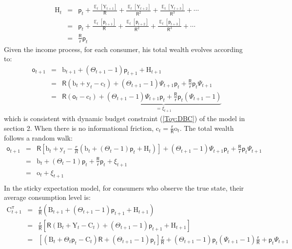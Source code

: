 \documentclass[12pt,letterpaper]{article}
\DeclareMathOperator{\E}{\mathbb{E}}
\begin{document}
\begin{eqnarray}
\mathrm{H}_{t} & = & \mathsf{p}_{t}+\frac{\E_{t}[\mathrm{Y}_{t+1}]}{\mathsf{R}}+\frac{\E_{t}[\mathrm{Y}_{t+2}]}{\mathsf{R}^2}+\frac{\E_{t}[\mathrm{Y}_{t+3}]}{\mathsf{R}^3}+\cdots\\
& = & \mathsf{p}_{t}+\frac{\E_{t}[\mathsf{p}_{t+1}]}{\mathsf{R}}+\frac{\E_{t}[\mathsf{p}_{t+2}]}{\mathsf{R}^2}+\frac{\E_{t}[\mathsf{p}_{t+3}]}{\mathsf{R}^3}+\cdots\\
& = & \frac{\mathsf{R}}{\mathsf{r}}\mathsf{p}_{t}
\end{eqnarray}
Given the income process, for each consumer, his total wealth evolves according to:
\begin{eqnarray*}
	\mathsf{o}_{t+1} & = & \mathrm{b}_{t+1}+\left(\Theta_{t+1}-1\right)\mathsf{p}_{t+1}+\mathrm{H}_{t+1}\\
	& = & \mathsf{R}\left(\mathrm{b}_{t}+\mathrm{y}_{t}-\mathrm{c}_{t}\right)+\left(\Theta_{t+1}-1\right)\Psi_{t+1}\mathsf{p}_{t}+\frac{\mathsf{R}}{\mathsf{r}}\mathsf{p}_{t}\Psi_{t+1}\\
	& = & \mathsf{R}\left(\mathsf{o}_{t}-\mathrm{c}_{t}\right)+\underbrace{\left(\Theta_{t+1}-1\right)\Psi_{t+1}\mathsf{p}_{t}+\frac{\mathsf{R}}{\mathsf{r}}\mathsf{p}_{t}\left(\Psi_{t+1}-1\right)}_{=\xi_{t+1}}
\end{eqnarray*}
which is consistent with dynamic budget constraint (\ref{Toy:DBC}) of the model in section 2. When there is no informational friction, $\mathrm{c}_{t}=\frac{\mathsf{r}}{\mathsf{R}}\mathrm{o}_{t}$. The total wealth follows a random walk:
\begin{eqnarray*}
	\mathsf{o}_{t+1}& = & \mathsf{R}\left[\mathrm{b}_{t}+\mathrm{y}_{t}-\frac{r}{R}\left(\mathrm{b}_{t}+\left(\Theta_{t}-1\right)\mathsf{p}_{t}+\mathrm{H}_{t}\right)\right]+\left(\Theta_{t+1}-1\right)\Psi_{t+1}\mathsf{p}_{t}+\frac{\mathsf{R}}{\mathsf{r}}\mathsf{p}_{t}\Psi_{t+1}\\
	& = &
	\mathrm{b}_{t}+\left(\Theta_{t}-1\right)\mathsf{p}_{t}+\frac{\mathsf{R}}{\mathsf{r}}\mathsf{p}_{t}+\xi_{t+1}\\
	& = & \mathrm{o}_{t}+\xi_{t+1}\\
\end{eqnarray*}
In the sticky expectation model, for consumers who observe the true state, their average consumption level is:
\begin{eqnarray} \label{A1: AggC}
\mathrm{C}^{\pi}_{t+1} & = & \frac{\mathsf{r}}{\mathsf{R}}\left(\mathrm{B}_{t+1}+\left(\Theta_{t+1}-1\right)\mathsf{p}_{t+1}+\mathrm{H}_{t+1}\right) \\
& = & \frac{\mathsf{r}}{\mathsf{R}}\left[\mathsf{R}\left(\mathrm{B}_{t}+\mathrm{Y}_{t}-\mathrm{C}_{t}\right)+\left(\Theta_{t+1}-1\right)\mathsf{p}_{t+1}+\mathrm{H}_{t+1}\right] \nonumber\\
& = & \left[\left(\mathrm{B}_{t}+\Theta_{t}\mathsf{p}_{t}-\mathrm{C}_{t}\right)\mathsf{R}+\left(\Theta_{t+1}-1\right)\mathsf{p}_{t}\right]\frac{\mathsf{r}}{\mathsf{R}}+\left(\Theta_{t+1}-1\right)\mathsf{p}_{t}\left(\Psi_{t+1}-1\right)\frac{\mathsf{r}}{\mathsf{R}}+\mathsf{p}_{t}\Psi_{t+1} \nonumber
\end{eqnarray}
\end{document}
